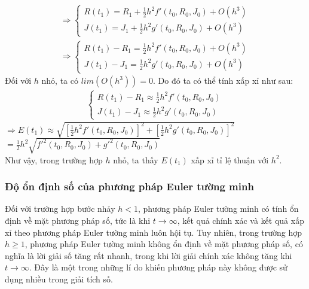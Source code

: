 \begin{align}
    \Rightarrow
    \begin{cases}
        R(t_1) = R_1 + \frac{1}{2}h^2f'(t_0, R_0, J_0) + O(h^3)\\
        J(t_1) = J_1 + \frac{1}{2}h^2g'(t_0, R_0, J_0) + O(h^3)
    \end{cases}
\end{align}
\begin{align}
    \Rightarrow
    \begin{cases}
        R(t_1) - R_1 = \frac{1}{2}h^2f'(t_0, R_0, J_0) + O(h^3)\\
        J(t_1) - J_1 = \frac{1}{2}h^2g'(t_0, R_0, J_0) + O(h^3)
    \end{cases}
\end{align}
\hspace*{0.5cm} {Đối với $h$ nhỏ, ta có  $lim(O(h^3)) = 0$. Do đó ta có thể tính xấp xỉ như sau:}
\begin{align}
    \begin{cases}
        R(t_1) - R_1 \approx \frac{1}{2}h^2f'(t_0, R_0, J_0)\\
        J(t_1) - J_1 \approx \frac{1}{2}h^2g'(t_0, R_0, J_0)
    \end{cases}
\end{align}
\hspace*{3cm} {$\Rightarrow E(t_1) \approx \sqrt{[\frac{1}{2}h^2f'(t_0, R_0, J_0)]^2 + [\frac{1}{2}h^2g'(t_0, R_0, J_0)]^2}$}\\
\hspace*{4cm} {$= \frac{1}{2}h^2\sqrt{f'^2(t_0,R_0,J_0) + g'^2(t_0,R_0,J_0)}$}\\
\hspace*{0.5cm} {Như vậy, trong trường hợp $h$ nhỏ, ta thấy $E(t_1)$ xấp xỉ tỉ lệ thuận với $h^2$.}
\subsubsection{Độ ổn định số của phương pháp Euler tường minh}
\hspace*{0.5cm} {Đối với trường hợp bước nhảy $h < 1$, phương pháp Euler tường minh có tính ổn định về mặt phương pháp số, tức là khi $t \rightarrow \infty$, kết quả chính xác và kết quả xấp xỉ theo phương pháp Euler tường minh luôn hội tụ. Tuy nhiên, trong trường hợp $h \geq 1$, phương pháp Euler tường minh không ổn định về mặt phương pháp số, có nghĩa là lời giải số tăng rất nhanh, trong khi lời giải chính xác không tăng khi $t \rightarrow \infty$. Đây là một trong những lí do khiến phương pháp này không được sử dụng nhiều trong giải tích số.}
